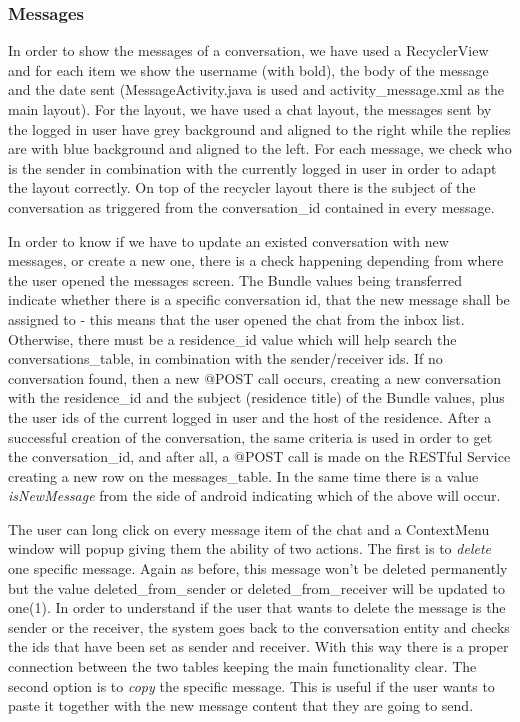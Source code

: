\documentclass[12pt]{article}
\begin{document}
	\subsubsection{Messages}
	In order to show the messages of a conversation, we have used a RecyclerView and for each item we show the username (with bold), the body of the message and the date sent (MessageActivity.java is used and activity\_message.xml as the main layout). For the layout, we have used a chat layout, the messages sent by the logged in user have grey background and aligned to the right while the replies are with blue background and aligned to the left. For each message, we check who is the sender in combination with the currently logged in user in order to adapt the layout correctly. On top of the recycler layout there is the subject of the conversation as triggered from the conversation\_id contained in every message. 
	
	In order to know if we have to update an existed conversation with new messages, or create a new  one, there is a check happening  depending from where the user opened the messages screen. The Bundle values being transferred indicate whether there is a specific conversation id, that the new message shall be assigned to - this means that the user opened the chat from the inbox list. Otherwise, there must be a residence\_id value which will help search the conversations\_table, in combination with the sender/receiver ids.  If no conversation found, then a new @POST call occurs, creating a new conversation with the residence\_id and the subject (residence title) of the Bundle values, plus the user ids of the current logged in user and the host of the residence. After a successful creation of the conversation, the same criteria is used in order to get the conversation\_id, and after all, a @POST call is made on the RESTful Service creating a new row on the messages\_table. In the same time there is a value \textit{isNewMessage} from the side of android indicating which of the above will occur.
	
	The user can long click on every message item of the chat and a ContextMenu window will popup giving them the ability of two actions. The first is to \textit{delete} one specific message. Again as before, this message won't be deleted permanently but the value deleted\_from\_sender or deleted\_from\_receiver will be updated to one(1). In order to understand if the user that wants to delete the message is the sender or the receiver, the system goes back to the conversation entity and checks the ids that have been set as sender and receiver. With this way there is a proper connection between the two tables keeping the main functionality clear. The second option is to \textit{copy} the specific message. This is useful if the user wants to paste it together with the new message content that they are going to send.
	
\end{document}
